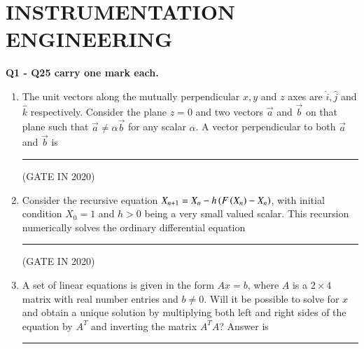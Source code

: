 \documentclass[journal,12pt,onecolumn]{IEEEtran}
\theoremstyle{remark}
\begin{document}
\section*{INSTRUMENTATION ENGINEERING}

\textbf{Q1 - Q25 carry one mark each.}    

\begin{enumerate}

\item The unit vectors along the mutually perpendicular $x, y$ and $z$ axes are $\hat{i}, \hat{j}$ and $\hat{k}$ respectively. Consider the plane $z = 0$ and two vectors $\vec{a}$ and $\vec{b}$ on that plane such that $\vec{a} \neq \alpha \vec{b}$ for any scalar $\alpha$. A vector perpendicular to both $\vec{a}$ and $\vec{b}$ is \rule{2cm}{0.4pt}

\hfill{(GATE IN 2020)}
\begin{enumerate}
\end{enumerate}

\item Consider the recursive equation $X_{n+1} = X_n - h \left( F\left(X_n\right) - X_n \right)$, with initial condition $X_0 = 1$ and $h > 0$ being a very small valued scalar. This recursion numerically solves the ordinary differential equation \rule{2cm}{0.4pt}

\hfill{(GATE IN 2020)}
\begin{enumerate}
\end{enumerate}

\item A set of linear equations is given in the form $Ax = b$, where $A$ is a $2 \times 4$ matrix with real number entries and $b \neq 0$. Will it be possible to solve for $x$ and obtain a unique solution by multiplying both left and right sides of the equation by $A^T$  and inverting the matrix $A^T A$? Answer is \rule{2cm}{0.4pt}


\end{enumerate}
\end{document}
